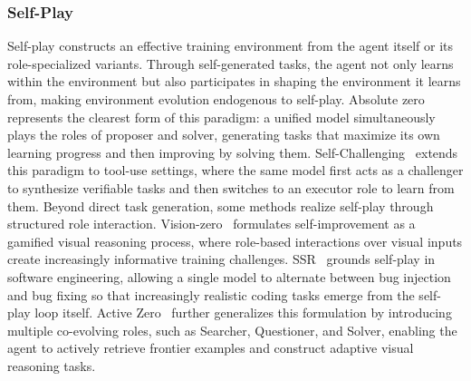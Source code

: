 \documentclass{llmxive}
\begin{document}
\subsubsection{Self-Play}\label{sec:self-play}
Self-play constructs an effective training environment from the agent itself or its role-specialized variants.
Through self-generated tasks, the agent not only learns within the environment but also participates in shaping the environment it learns from, making environment evolution endogenous to self-play.
%
Absolute zero~\cite{Absolute_zero} represents the clearest form of this paradigm: a unified model simultaneously plays the roles of proposer and solver, generating tasks that maximize its own learning progress and then improving by solving them.
Self-Challenging~\cite{Self-Challenging} extends this paradigm to tool-use settings, where the same model first acts as a challenger to synthesize verifiable tasks and then switches to an executor role to learn from them.
%
Beyond direct task generation, some methods realize self-play through structured role interaction.
Vision-zero~\cite{Vision-zero} formulates self-improvement as a gamified visual reasoning process, where role-based interactions over visual inputs create increasingly informative training challenges.
SSR~\cite{SSR} grounds self-play in software engineering, allowing a single model to alternate between bug injection and bug fixing so that increasingly realistic coding tasks emerge from the self-play loop itself.
Active Zero~\cite{Active_Zero} further generalizes this formulation by introducing multiple co-evolving roles, such as Searcher, Questioner, and Solver, enabling the agent to actively retrieve frontier examples and construct adaptive visual reasoning tasks.
%
\end{document}
